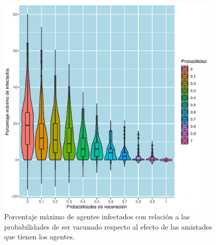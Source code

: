 \documentclass{article}
\begin{document}
\begin{figure}[h!]
\centering\includegraphics[width=105mm]{ResultadosP6R2.eps}
\caption{Porcentaje m\'aximo de agentes infectados con relaci\'on a las probabilidades de ser vacunado respecto al efecto de las amistades que tienen los agentes.}
\label{fig:resultadosR2}
\end{figure}
\end{document}
